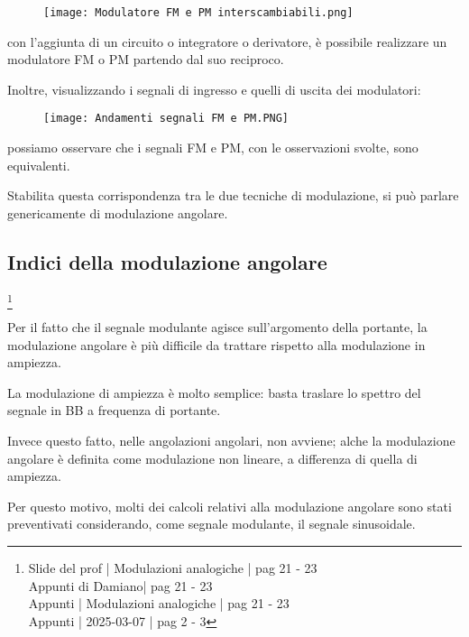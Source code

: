 \begin{figure}[h]
    \centering
    \texttt{[image: Modulatore FM e PM interscambiabili.png]}
\end{figure} 

con l'aggiunta di un circuito o integratore o derivatore, 
è possibile realizzare un modulatore FM o PM partendo dal suo reciproco. \newline 

\newpage

Inoltre, visualizzando i segnali di ingresso e quelli di uscita dei modulatori: 

\begin{figure}[h]
    \centering
    \texttt{[image: Andamenti segnali FM e PM.PNG]}
\end{figure} 

possiamo osservare che i segnali FM e PM, con le osservazioni svolte, sono equivalenti. \newline 

Stabilita questa corrispondenza tra le due tecniche di modulazione, si può parlare genericamente di modulazione angolare. \newline 

\newpage 

\subsection{Indici della modulazione angolare}
\footnote{Slide del prof | Modulazioni analogiche | pag 21 - 23\\  
Appunti di Damiano| pag 21 - 23\\
Appunti | Modulazioni analogiche | pag 21 - 23\\
Appunti | 2025-03-07 | pag 2 - 3
} 

Per il fatto che il segnale modulante agisce sull'argomento della portante, 
la modulazione angolare è più difficile da trattare rispetto alla modulazione in ampiezza. \newline 

La modulazione di ampiezza è molto semplice: basta traslare lo spettro del segnale in BB a frequenza di portante. \newline 

Invece questo fatto, nelle angolazioni angolari, non avviene; alche la modulazione angolare è definita come modulazione non lineare, a differenza di quella di ampiezza. \newline 

Per questo motivo, molti dei calcoli relativi alla modulazione angolare sono stati preventivati considerando, 
come segnale modulante, il segnale sinusoidale. \newline 

